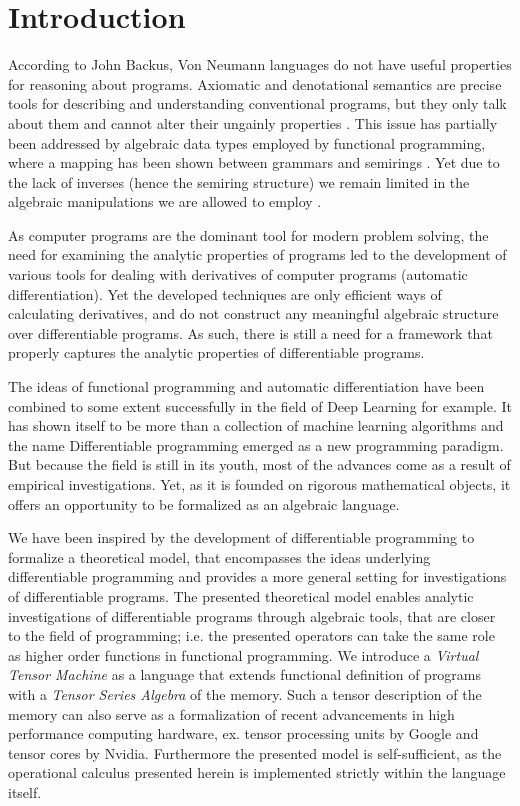 \section{Introduction}

According to John Backus, Von Neumann languages do not have useful properties for reasoning about programs. Axiomatic and denotational semantics are precise tools for describing and understanding conventional programs, but they only talk about them and cannot alter their ungainly
properties \cite{backus}. This issue has partially been addressed by algebraic data types employed by functional programming, where a mapping has been shown between grammars and semirings \cite{7Trees}.
Yet due to the lack of inverses (hence the semiring structure) we remain limited in the algebraic manipulations we are allowed to employ \cite{complexCat}.

As computer programs are the dominant tool for modern problem solving, the need for examining the analytic properties of programs led to the development of various tools for dealing with derivatives of computer programs (automatic differentiation). Yet the developed techniques are only efficient ways of calculating derivatives, and do not construct any meaningful algebraic structure over differentiable programs. As such, there is still a need for a framework that properly captures the analytic properties of differentiable programs. 

The ideas of functional programming and automatic differentiation have been combined to some extent successfully in the field of Deep Learning for example. %
It has shown itself to be more than a collection of machine learning algorithms and the name Differentiable programming emerged as a new programming paradigm. 
But because the field is still in its youth, most of the advances come as a result of empirical investigations.
Yet, as it is founded on rigorous mathematical objects, it offers an opportunity to be formalized as an algebraic language.

We have been inspired by the development of differentiable programming to formalize a theoretical model, that encompasses the ideas underlying differentiable programming and provides a more general setting for investigations of differentiable programs. The presented theoretical model enables analytic investigations of differentiable programs through algebraic tools, that are closer to the field of programming; i.e. the presented operators can take the same role as higher order functions in functional programming. We introduce a \emph{Virtual Tensor Machine} as a language that extends functional definition of programs with a \emph{Tensor Series Algebra} of the memory. Such a tensor description of the memory can also serve as a formalization of recent advancements in high performance computing hardware, ex. tensor processing units by Google and tensor cores by Nvidia. Furthermore the presented model is self-sufficient, as the operational calculus presented herein is implemented strictly within the language itself.

